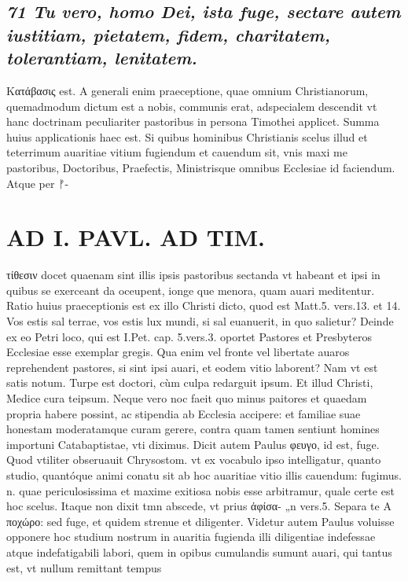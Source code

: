 \documentclass{article}
\begin{document}
\begin{pages}
\subsection*{\textit{71 Tu vero, homo Dei, ista fuge, sectare autem iustitiam, pietatem, fidem, charitatem, tolerantiam, lenitatem. }}\pstart Κατάβασις est. A generali enim praeceptione, quae omnium Christianorum, quemadmodum dictum est a nobis, communis erat, adspecialem descendit vt hanc doctrinam peculiariter pastoribus in persona Timothei applicet. Summa huius applicationis haec est. Si quibus hominibus Christianis scelus illud et teterrimum auaritiae vitium fugiendum et cauendum sit, vnis maxi me pastoribus, Doctoribus, Praefectis, Ministrisque omnibus Ecclesiae id faciendum. Atque per ᚠ-  \pend
\section*{AD I. PAVL. AD TIM. }
\marginpar{[ p.50. ]}\pstart τίθεσιν docet quaenam sint illis ipsis pastoribus sectanda vt habeant et ipsi in quibus se exerceant da oceupent, ionge que menora, quam auari meditentur.  \pend\pstart Ratio huius praeceptionis est ex illo Christi dicto, quod est Matt.5. vers.13. et 14. Vos estis sal terrae, vos estis lux mundi, si sal euanuerit, in quo salietur? Deinde ex eo Petri loco, qui est I.Pet. cap. 5.vers.3. oportet Pastores et Presbyteros Ecclesiae esse exemplar gregis. Qua enim vel fronte vel libertate auaros reprehendent pastores, si sint ipsi auari, et eodem vitio laborent? Nam vt est satis notum.  \pend\pstart Turpe est doctori, cùm culpa redarguit ipsum. Et illud Christi, Medice cura teipsum. Neque  vero noc faeit quo minus paitores et quaedam propria habere possint, ac stipendia ab Ecclesia accipere: et familiae suae honestam moderatamque curam gerere, contra quam tamen sentiunt homines importuni Catabaptistae, vti diximus.  \pend\pstart Dicit autem Paulus φευγο, id est, fuge. Quod vtiliter obseruauit Chrysostom. vt ex vocabulo ipso intelligatur, quanto studio, quantóque animi conatu sit ab hoc auaritiae vitio illis cauendum: fugimus. n. quae periculosissima et maxime exitiosa nobis esse arbitramur, quale certe est hoc scelus. Itaque  non dixit tmn abscede, vt prius ἀφίσα- „n vers.5. Separa te Α ποχώρο: sed fuge, et quidem strenue et diligenter. Videtur autem Paulus voluisse opponere hoc studium nostrum in auaritia fugienda illi diligentiae indefessae atque indefatigabili labori, quem in opibus cumulandis sumunt auari, qui tantus est, vt nullum remittant tempus  \pend

\end{pages}
\end{document}
